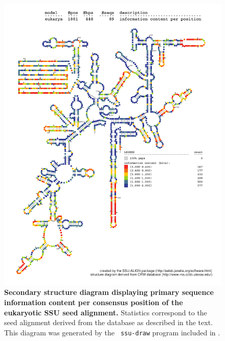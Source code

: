 \begin{figure}
\begin{center}
\includegraphics[width=5.7in]{Figures/eukarya-0p1-info}
\end{center}
\caption[Secondary structure diagram displaying primary sequence
  information content per consensus position of the eukaryotic SSU seed
  alignment]{\textbf{Secondary structure diagram displaying primary
  sequence information content per consensus position of the eukaryotic SSU seed
  alignment.} Statistics correspond to the  seed
  alignment derived from the  database \cite{CannoneGutell02}
  as described in the text. This diagram was generated by the {\tt
  ssu-draw} program included in .}
\label{fig:eukinfo}
\end{figure}


